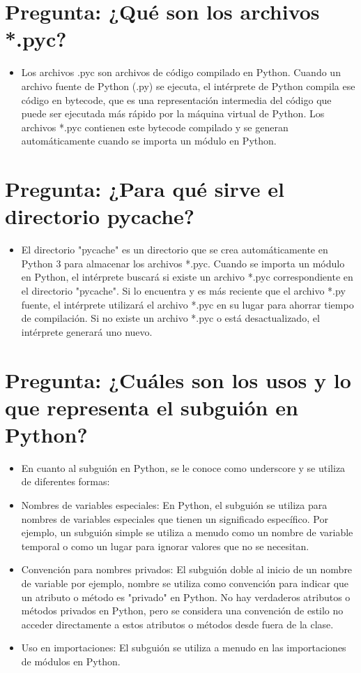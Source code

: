 \documentclass{article}
\begin{document}
\section{Pregunta: ¿Qué son los archivos *.pyc?}
	\begin{itemize}
		\item Los archivos .pyc son archivos de código compilado en Python. Cuando un archivo fuente de Python (.py) se ejecuta, el intérprete de Python compila ese código en bytecode, que es una representación intermedia del código que puede ser ejecutada más rápido por la máquina virtual de Python. Los archivos *.pyc contienen este bytecode compilado y se generan automáticamente cuando se importa un módulo en Python.
	\end{itemize}	
	\section{Pregunta: ¿Para qué sirve el directorio pycache?}
	\begin{itemize}
		\item El directorio "pycache" es un directorio que se crea automáticamente en Python 3 para almacenar los archivos *.pyc. Cuando se importa un módulo en Python, el intérprete buscará si existe un archivo *.pyc correspondiente en el directorio "pycache". Si lo encuentra y es más reciente que el archivo *.py fuente, el intérprete utilizará el archivo *.pyc en su lugar para ahorrar tiempo de compilación. Si no existe un archivo *.pyc o está desactualizado, el intérprete generará uno nuevo.
	\end{itemize}	
	\section{Pregunta: ¿Cuáles son los usos y lo que representa el subguión en Python?}
	\begin{itemize}
		\item En cuanto al subguión en Python, se le conoce como underscore y se utiliza de diferentes formas:
		\item Nombres de variables especiales: En Python, el subguión se utiliza para nombres de variables especiales que tienen un significado específico. Por ejemplo, un subguión simple se utiliza a menudo como un nombre de variable temporal o como un lugar para ignorar valores que no se necesitan.
		\item Convención para nombres privados: El subguión doble al inicio de un nombre de variable por ejemplo, nombre se utiliza como convención para indicar que un atributo o método es "privado" en Python. No hay verdaderos atributos o métodos privados en Python, pero se considera una convención de estilo no acceder directamente a estos atributos o métodos desde fuera de la clase.
		\item Uso en importaciones: El subguión se utiliza a menudo en las importaciones de módulos en Python.
	\end{itemize}		
\end{document}
